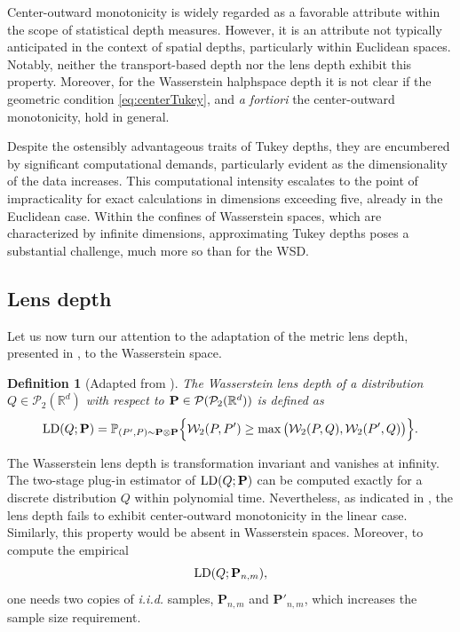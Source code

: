 \documentclass{imsart}
\newtheorem {Definition}{Definition}[section]
\numberwithin{equation}{section}
\def\R{\mathbb{R}}
\begin{document}
Center-outward monotonicity is widely regarded as a favorable attribute within the scope of statistical depth measures. However, it is an attribute not typically anticipated in the context of spatial depths, particularly within Euclidean spaces. Notably, neither the transport-based depth nor the lens depth exhibit this property.  Moreover, for the Wasserstein halphspace depth it is not clear if the geometric condition \eqref{eq:centerTukey}, and {\it a fortiori} the center-outward monotonicity, hold in general. 


Despite the ostensibly advantageous traits of Tukey depths, they are encumbered by significant computational demands, particularly evident as the dimensionality of the data increases. This computational intensity escalates to the point of impracticality for exact calculations in dimensions exceeding five, already in the Euclidean case. Within the confines of Wasserstein spaces, which are characterized by infinite dimensions, approximating Tukey depths poses a substantial challenge, much more so than for the WSD. 

\subsection{Lens depth}
Let us now turn our attention to the adaptation of the metric lens depth, presented in \cite{Geenens2023}, to the Wasserstein space.
\begin{Definition}[Adapted from \cite{Geenens2023}]
	The Wasserstein lens depth of a distribution $Q\in \mathcal{P}_2(\R^d)$ with respect to  ${\bf P}\in \mathcal{P}(\mathcal{P}_2(\R^d)) $ is defined as 
	$$ \mathrm{LD}(Q;{\bf P} )=\mathbb{P}_{(P',P)\sim {\bf P} \otimes {\bf P} }\Big\{ \mathcal{W}_2( P,P')\geq \max\big(  \mathcal{W}_2( P,Q),  \mathcal{W}_2( P',Q) \big)  \Big\}.$$
\end{Definition}
The Wasserstein lens depth is transformation invariant and 
vanishes at infinity. The two-stage plug-in estimator of $\mathrm{LD}(Q;{\bf P} )$ can be computed exactly for a discrete distribution $Q$ within polynomial time. Nevertheless, as indicated in \cite{Geenens2023}, the lens depth fails to exhibit center-outward monotonicity in the linear case. Similarly, this property would be absent in Wasserstein spaces. Moreover, to compute the empirical $$\mathrm{LD}(Q;{\bf P}_{n,m}),$$ one needs two copies of \textit{i.i.d.} samples, $\mathbf{P}_{n,m}$ and $\mathbf{P}'_{n,m}$, which increases the sample size requirement.  
\end{document}

